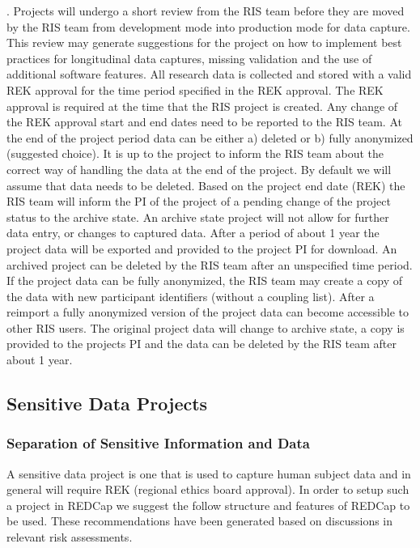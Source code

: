 \documentclass[letterpaper,10pt,english]{sphinxmanual}
\begin{document}
. Projects will undergo a short review from the RIS team before they are moved by the RIS team from development mode into production mode for data capture. This review may generate suggestions for the project on how to implement best practices for longitudinal data captures, missing validation and the use of additional software features. All research data is collected and stored with a valid REK approval for the time period specified in the REK approval. The REK approval is required at the time that the RIS project is created. Any change of the REK approval start and end dates need to be
reported to the RIS team. At the end of the project period data can be either a) deleted or b) fully anonymized (suggested choice). It is up to the project to inform the RIS team about the correct way of handling the data at the end of the project. By default we will assume that data needs to be deleted. Based on the project end date (REK) the RIS team will inform the PI of the project of a pending change of the project status to the archive state. An archive state project will not allow for further data entry, or changes to captured data. After a period of about 1 year the project data will be exported and provided to the project PI for download. An archived project can be deleted by the RIS team after an unspecified time period. If the project data can be fully anonymized, the RIS team may create a copy of the data with new participant identifiers (without a coupling list). After a re\sphinxhyphen{}import a fully anonymized version of the project data can become accessible to other RIS users. The original project
data will change to archive state, a copy is provided to the projects PI and the data can be deleted by the RIS team after about 1 year.


\subsection{Sensitive Data Projects}
\label{\detokenize{EndUser/index:sensitive-data-projects}}

\subsubsection{Separation of Sensitive Information and Data}
\label{\detokenize{EndUser/index:separation-of-sensitive-information-and-data}}
\sphinxAtStartPar
A sensitive data project is one that is used to capture human subject data and in general will require  REK (regional ethics board approval). In order to setup such a project in REDCap we suggest the follow structure and features of REDCap to be used. These recommendations have been generated based
on discussions in relevant risk assessments.
\end{document}
